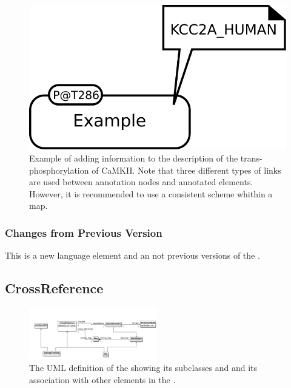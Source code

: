 \begin{figure}[H]
  \centering
  \includegraphics[scale = 0.5]{examples/ex-annotation}
  \caption{Example of  adding information to the description of the trans-phosphorylation of CaMKII. Note that three different types of links are used between annotation nodes and annotated elements. However, it is recommended to use a consistent scheme whithin a map.}
  \label{fig:ex-annotation}
\end{figure}

\subsubsection{Changes from Previous Version}

This is a new language element and an not previous versions of the \PDl.


\subsection{CrossReference}
\label{defn:CrossReference}

\begin{figure}[htb]
  \centering
  \includegraphics[width = 0.5\textwidth]{images/crossreferenceuml}
  \caption{The UML definition of the  showing
    its subclasses  and  and
    its association with other elements in the \PDl.}
  \label{fig:crossreferenceuml}
\end{figure}


